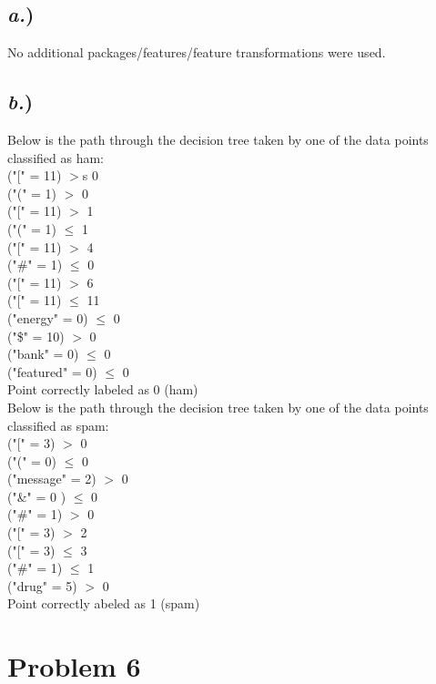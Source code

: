\documentclass{report}
\begin{document}
\subsection*{\textit{a.})}

No additional packages/features/feature transformations were used.


\subsection*{\textit{b.})}

Below is the path through the decision tree taken by one of the data points classified as ham: \\
("[" = 11) $>$s 0\\
("(" = 1) $>$ 0\\
("[" = 11) $>$ 1\\
("(" = 1) $\leq$ 1\\
("[" = 11) $>$ 4\\
("\#" = 1) $\leq$ 0\\
("[" = 11) $>$ 6\\
("[" = 11) $\leq$ 11\\
("energy" = 0) $\leq$ 0\\
("\$" = 10) $>$ 0\\
("bank" = 0) $\leq$ 0\\
("featured" = 0) $\leq$ 0\\
Point correctly labeled as 0 (ham)\\

Below is the path through the decision tree taken by one of the data points classified as spam: \\
("[" = 3) $>$ 0\\
("(" = 0) $\leq$ 0\\
("message" = 2) $>$ 0\\
("\&" = 0 ) $\leq$ 0\\
("\#" = 1)  $>$ 0\\
("[" = 3)  $>$ 2\\
("[" = 3) $\leq$ 3\\
("\#" = 1) $\leq$ 1\\
("drug" = 5) $>$ 0\\
Point correctly abeled as 1 (spam) \\



\newpage
\section*{Problem 6}
\end{document}
